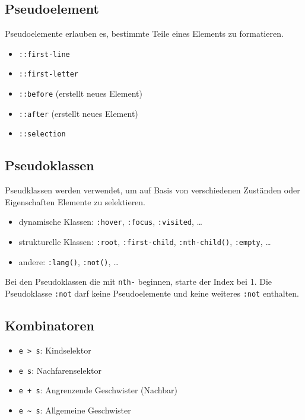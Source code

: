 \documentclass[11pt,twoside,landscape]{article}
\begin{document}
\begin{multicols}{4}
\subsection{Pseudoelement}
\label{sec:org86233df}
Pseudoelemente erlauben es, bestimmte Teile eines Elements zu formatieren.
\begin{itemize}
\item \texttt{::first-line}
\item \texttt{::first-letter}
\item \texttt{::before} (erstellt neues Element)
\item \texttt{::after} (erstellt neues Element)
\item \texttt{::selection}
\end{itemize}


\subsection{Pseudoklassen}
\label{sec:org67fa442}
Pseudklassen werden verwendet, um auf Basis von verschiedenen Zuständen oder Eigenschaften Elemente zu selektieren.
\begin{itemize}
\item dynamische Klassen: \texttt{:hover}, \texttt{:focus}, \texttt{:visited}, \ldots{}
\item strukturelle Klassen: \texttt{:root}, \texttt{:first-child}, \texttt{:nth-child()}, \texttt{:empty}, \ldots{}
\item andere: \texttt{:lang()}, \texttt{:not()}, \ldots{}
\end{itemize}


Bei den Pseudoklassen die mit \texttt{nth-} beginnen, starte der Index bei 1. Die Pseudoklasse \texttt{:not} darf keine Pseudoelemente und keine weiteres \texttt{:not} enthalten.


\subsection{Kombinatoren}
\label{sec:org9ba9ff5}
\begin{itemize}
\item \texttt{e > s}: Kindselektor
\item \texttt{e s}: Nachfarenselektor
\item \texttt{e + s}: Angrenzende Geschwister (Nachbar)
\item \texttt{e \textasciitilde{} s}: Allgemeine Geschwister
\end{itemize}



\end{multicols}
\end{document}
